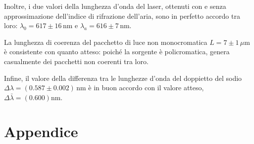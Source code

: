 \documentclass[]{article}
\let\oldsection\section%
\renewcommand{\section}{%
	\renewcommand{\theequation}{\thesection.\arabic{equation}}%
	\oldsection}%
\begin{document}
Inoltre, i due valori della lunghezza d'onda del laser, ottenuti con e senza approssimazione dell'indice di rifrazione dell'aria, sono in perfetto accordo tra loro: $\lambda_{0} = 617 \pm 16 \, \text{nm}$ e $ \lambda_{a} =616 \pm 7 \, \text{nm}$.

La lunghezza di coerenza del pacchetto di luce non monocromatica $L= 7 \pm 1 \, \mu \text{m}$ è consistente con quanto atteso: poiché la sorgente è policromatica, genera casualmente dei pacchetti non coerenti tra loro.

Infine, il valore della differenza tra le lunghezze d'onda del doppietto del sodio $\Delta \lambda = (0.587 \pm 0.002) \, \text{nm}$ è in buon accordo con il valore atteso, $\Delta \bar{\lambda} = (0.600) \text{nm}$.

\section*{Appendice}
\end{document}
